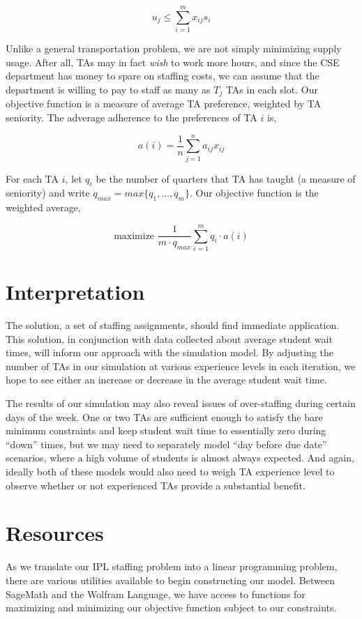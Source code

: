 \documentclass{article}
\begin{document}
\begin{multicols}{2}
\begin{equation}
u_j \leq \sum_{i=1}^{m}x_{ij}s_i
\end{equation}

Unlike a general transportation problem, we are not simply minimizing supply usage. After all, TAs may in fact \textit{wish} to work more hours, and since the CSE department has money to spare on staffing costs, we can assume that the department is willing to pay to staff as many as $T_j$ TAs in each slot. Our objective function is a measure of average TA preference, weighted by TA seniority. The adverage adherence to the preferences of TA $i$ is,

\begin{equation}
a(i) = \frac{1}{n}\sum_{j=1}^na_{ij}x_{ij}
\end{equation}

For each TA $i$, let $q_i$ be the number of quarters that TA has taught (a measure of seniority) and write $q_{max} = max\{q_1, ..., q_m\}$. Our objective function is the weighted average,

\begin{equation}
\textrm{maximize } \frac{1}{m\cdot q_{max}} \sum_{i=1}^mq_i\cdot a(i)
\end{equation}

\section*{Interpretation}
The solution, a set of staffing assignments, should find immediate application. This solution, in conjunction with data collected about average student wait times, will inform our approach with the simulation model. By adjusting the number of TAs in our simulation at various experience levels in each iteration, we hope to see either an increase or decrease in the average student wait time.

The results of our simulation may also reveal issues of over-staffing during certain days of the week. One or two TAs are sufficient enough to satisfy the bare minimum constraints and keep student wait time to essentially zero during “down” times, but we may need to separately model “day before due date” scenarios, where a high volume of students is almost always expected. And again, ideally both of these models would also need to weigh TA experience level to observe whether or not experienced TAs provide a substantial benefit.

\section*{Resources}
As we translate our IPL staffing problem into a linear programming problem, there are various utilities available to begin constructing our model. Between SageMath and the Wolfram Language, we have access to functions for maximizing and minimizing our objective function subject to our constraints.


\end{multicols}
\end{document}
